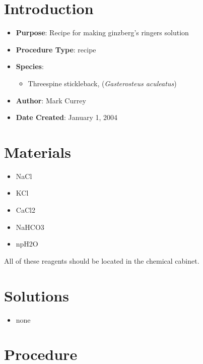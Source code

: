 \documentclass[
  letterpaper,
  DIV=11,
  numbers=noendperiod]{scrreprt}
\providecommand{\tightlist}{%
  \setlength{\itemsep}{0pt}\setlength{\parskip}{0pt}}\usepackage{longtable,booktabs,array}
\begin{document}
\hypertarget{introduction-94}{%
\section{Introduction}\label{introduction-94}}

\begin{itemize}
\tightlist
\item
  \textbf{Purpose}: Recipe for making ginzberg's ringers solution\\
\item
  \textbf{Procedure Type}: recipe
\item
  \textbf{Species}:

  \begin{itemize}
  \tightlist
  \item
    Threespine stickleback, (\emph{Gasterosteus aculeatus})
  \end{itemize}
\item
  \textbf{Author}: Mark Currey
\item
  \textbf{Date Created}: January 1, 2004
\end{itemize}

\hypertarget{materials-89}{%
\section{Materials}\label{materials-89}}

\begin{itemize}
\tightlist
\item
  NaCl
\item
  KCl
\item
  CaCl2
\item
  NaHCO3
\item
  npH2O
\end{itemize}

All of these reagents should be located in the chemical cabinet.

\hypertarget{solutions-80}{%
\section{Solutions}\label{solutions-80}}

\begin{itemize}
\tightlist
\item
  none
\end{itemize}

\hypertarget{procedure-89}{%
\section{Procedure}\label{procedure-89}}
\end{document}

